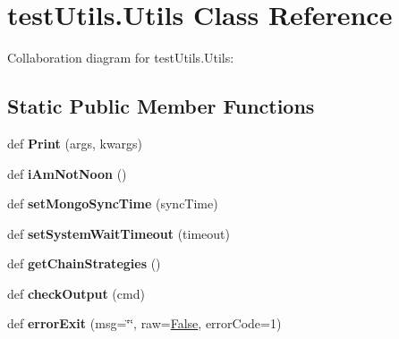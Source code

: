 \hypertarget{classtest_utils_1_1_utils}{}\section{test\+Utils.\+Utils Class Reference}
\label{classtest_utils_1_1_utils}


Collaboration diagram for test\+Utils.\+Utils\+:
\subsection*{Static Public Member Functions}
\begin{DoxyCompactItemize}
\item 
\mbox{\label{classtest_utils_1_1_utils_abb43cf23084a35cb87e0ce77119105de}} 
def {\bfseries Print} (args, kwargs)
\item 
\mbox{\label{classtest_utils_1_1_utils_a0d843742b5325ace6cae1c968b24f185}} 
def {\bfseries i\+Am\+Not\+Noon} ()
\item 
\mbox{\label{classtest_utils_1_1_utils_abc5ded3a284e952f065739e4b5c140a1}} 
def {\bfseries set\+Mongo\+Sync\+Time} (sync\+Time)
\item 
\mbox{\label{classtest_utils_1_1_utils_a61c48c3ed4aa386a488fad7d83723249}} 
def {\bfseries set\+System\+Wait\+Timeout} (timeout)
\item 
\mbox{\label{classtest_utils_1_1_utils_aceb49b57abe3740ae5a7fee0eca9d393}} 
def {\bfseries get\+Chain\+Strategies} ()
\item 
\mbox{\label{classtest_utils_1_1_utils_a641884e4a1a62ebb3af4390dabfedaa4}} 
def {\bfseries check\+Output} (cmd)
\item 
\mbox{\label{classtest_utils_1_1_utils_a21a8d4cd9f5166848b086b1aa3bd4301}} 
def {\bfseries error\+Exit} (msg=\char`\"{}\char`\"{}, raw=\mbox{\hyperlink{struct_false}{False}}, error\+Code=1)
\end{DoxyCompactItemize}
